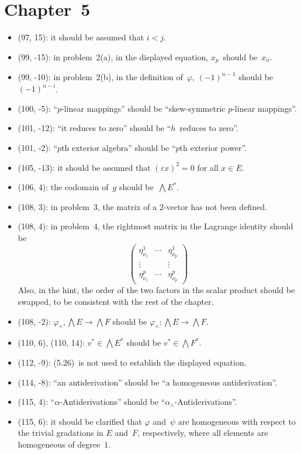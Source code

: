 \documentclass[letterpaper,12pt]{article}
\newcommand{\eprod}{\wedge}
\newcommand{\bigeprod}{\bigwedge}
\begin{document}
\section*{Chapter~5}
\begin{itemize}
\item (97, 15): it should be assumed that \(i<j\).
\item (99, -15): in problem~2(a), in the displayed equation, \(x_p\)~should be~\(x_n\).
\item (99, -10): in problem~2(b), in the definition of~\(\varphi\), \((-1)^{n-1}\) should be \((-1)^{n-i}\).
\item (100, -5): ``\(p\)-linear mappings'' should be ``skew-symmetric \(p\)-linear mappings''.
\item (101, -12): ``it reduces to zero'' should be ``\(h\)~reduces to zero''.
\item (101, -2): ``\(p\)th exterior algebra'' should be ``\(p\)th exterior power''.
\item (105, -13): it should be assumed that \((\varepsilon x)^2=0\) for all \(x\in E\).
\item (106, 4): the codomain of~\(g\) should be~\(\bigwedge E^*\).
\item (108, 3): in problem~3, the matrix of a 2-vector has not been defined.
\item (108, 4): in problem~4, the rightmost matrix in the Lagrange identity should be
\[
\begin{pmatrix}
\eta^1_{\nu_1}&\cdots&\eta^1_{\nu_p}\\
\vdots&&\vdots\\
\eta^p_{\nu_1}&\cdots&\eta^p_{\nu_p}
\end{pmatrix}
\]
Also, in the hint, the order of the two factors in the scalar product should be swapped, to be consistent with the rest of the chapter.
\item (108, -2): \(\varphi_{\eprod},\bigeprod E\to\bigeprod F\) should be \(\varphi_{\eprod}:\bigeprod E\to\bigeprod F\).
\item (110, 6), (110, 14): \(v^*\in\bigeprod E^*\) should be \(v^*\in\bigeprod F^*\).
\item (112, -9): (5.26)~is not used to establish the displayed equation.
\item (114, -8): ``an antiderivation'' should be ``a homogeneous antiderivation''.
\item (115, 4): ``\(\alpha\)-Antiderivations'' should be ``\(\alpha_{\eprod}\)-Antiderivations''.
\item (115, 6): it should be clarified that \(\varphi\) and~\(\psi\) are homogeneous with respect to the trivial gradations in \(E\) and~\(F\), respectively, where all elements are homogeneous of degree~\(1\).

\end{itemize}
\end{document}
